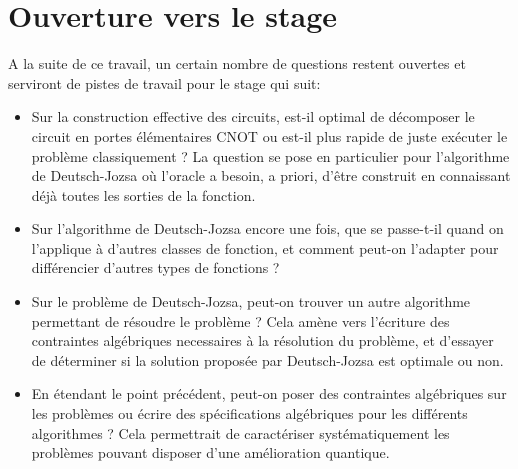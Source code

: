 \chapter{Ouverture vers le stage}

A la suite de ce travail, un certain nombre de questions restent ouvertes et serviront de pistes de travail pour le stage qui suit:

\begin{itemize}
    \item Sur la construction effective des circuits, est-il optimal de décomposer le circuit en portes élémentaires CNOT ou est-il plus rapide de juste exécuter le problème classiquement ? La question se pose en particulier pour l'algorithme de Deutsch-Jozsa où l'oracle a besoin, a priori, d'être construit en connaissant déjà toutes les sorties de la fonction.
    \item Sur l'algorithme de Deutsch-Jozsa encore une fois, que se passe-t-il quand on l'applique à d'autres classes de fonction, et comment peut-on l'adapter pour différencier d'autres types de fonctions ?
    \item Sur le problème de Deutsch-Jozsa, peut-on trouver un autre algorithme permettant de résoudre le problème ? Cela amène vers l'écriture des contraintes algébriques necessaires à la résolution du problème, et d'essayer de déterminer si la solution proposée par Deutsch-Jozsa est optimale ou non.
    \item En étendant le point précédent, peut-on poser des contraintes algébriques sur les problèmes ou écrire des spécifications algébriques pour les différents algorithmes ? Cela permettrait de caractériser systématiquement les problèmes pouvant disposer d'une amélioration quantique.
\end{itemize}